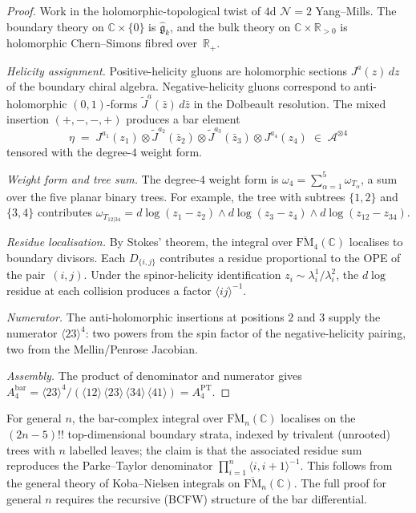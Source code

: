 \begin{proof}
Work in the holomorphic-topological twist of $4$d $\mathcal{N} = 2$ Yang--Mills. The boundary theory on $\mathbb{C} \times \{0\}$ is $\widehat{\mathfrak{g}}_k$, and the bulk theory on $\mathbb{C} \times \mathbb{R}_{> 0}$ is holomorphic Chern--Simons fibred over~$\mathbb{R}_+$.

\emph{Helicity assignment.}
Positive-helicity gluons are holomorphic sections $J^a(z)\,dz$ of the boundary chiral algebra. Negative-helicity gluons correspond to anti-holomorphic $(0,1)$-forms $\tilde J^a(\bar z)\,d\bar z$ in the Dolbeault resolution. The mixed insertion $(+,-,-,+)$ produces a bar element
\[
\eta \;=\; J^{a_1}(z_1) \otimes \tilde J^{a_2}(\bar z_2) \otimes
\tilde J^{a_3}(\bar z_3) \otimes J^{a_4}(z_4)
\;\in\; \mathcal{A}^{\otimes 4}
\]
tensored with the degree-$4$ weight form.

\emph{Weight form and tree sum.}
The degree-$4$ weight form is $\omega_4 = \sum_{\alpha=1}^{5} \omega_{T_\alpha}$, a sum over the five planar binary trees. For example, the tree with subtrees $\{1,2\}$ and $\{3,4\}$ contributes $\omega_{T_{12|34}} = d\log(z_1 - z_2) \wedge d\log(z_3 - z_4) \wedge d\log(z_{12} - z_{34})$.

\emph{Residue localisation.}
By Stokes' theorem, the integral over $\overline{\mathrm{FM}}_4(\mathbb{C})$ localises to boundary divisors. Each $D_{\{i,j\}}$ contributes a residue proportional to the OPE of the pair~$(i,j)$. Under the spinor-helicity identification $z_i \sim \lambda_i^1/\lambda_i^2$, the $d\log$ residue at each collision produces a factor $\langle ij\rangle^{-1}$.

\emph{Numerator.}
The anti-holomorphic insertions at positions $2$ and $3$ supply the numerator $\langle 23\rangle^4$: two powers from the spin factor of the negative-helicity pairing, two from the Mellin/Penrose Jacobian.

\emph{Assembly.}
The product of denominator and numerator gives $A_4^{\mathrm{bar}} = \langle 23\rangle^4 / (\langle 12\rangle\,\langle 23\rangle\,\langle 34\rangle\,\langle 41\rangle) = A_4^{\mathrm{PT}}$.
\end{proof}

\begin{remark}
\label{rem:cbt-mhv-general-n}
For general $n$, the bar-complex integral over $\overline{\mathrm{FM}}_n(\mathbb{C})$ localises on the $(2n-5)!!$ top-dimensional boundary strata, indexed by trivalent (unrooted) trees with $n$ labelled leaves; the claim is that the associated residue sum reproduces the Parke--Taylor denominator $\prod_{i=1}^{n}\langle i,i{+}1\rangle^{-1}$. This follows from the general theory of Koba--Nielsen integrals on $\overline{\mathrm{FM}}_n(\mathbb{C})$. The full proof for general $n$ requires the recursive (BCFW) structure of the bar differential.
\end{remark}

